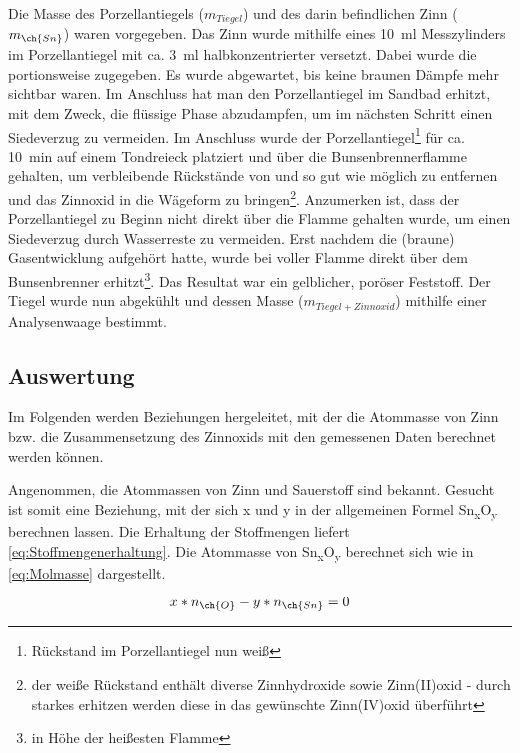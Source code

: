 \documentclass{article}
\begin{document}
      Die Masse des Porzellantiegels ($m_{Tiegel}$) und des darin befindlichen Zinn ($m_{\ch{Sn}}$) waren vorgegeben. Das Zinn wurde mithilfe eines \SI[mode=text]{10}{\milli\litre} Messzylinders im Porzellantiegel mit ca. \SI[mode=text]{3}{\milli\litre} halbkonzentrierter  versetzt. Dabei wurde die  portionsweise zugegeben. Es wurde abgewartet, bis keine braunen Dämpfe mehr sichtbar waren. Im Anschluss hat man den Porzellantiegel im Sandbad erhitzt, mit dem Zweck, die flüssige Phase abzudampfen, um im nächsten Schritt einen Siedeverzug zu vermeiden. Im Anschluss wurde der Porzellantiegel\footnote{Rückstand im Porzellantiegel nun weiß} für ca. \SI[mode=text]{10}{\minute} auf einem Tondreieck platziert und über die Bunsenbrennerflamme gehalten, um verbleibende Rückstände von  und  so gut wie möglich zu entfernen und das Zinnoxid in die Wägeform zu bringen\footnote{der weiße Rückstand enthält diverse Zinnhydroxide sowie Zinn(II)oxid - durch starkes erhitzen werden diese in das gewünschte Zinn(IV)oxid überführt}. Anzumerken ist, dass der Porzellantiegel zu Beginn nicht direkt über die Flamme gehalten wurde, um einen Siedeverzug durch Wasserreste zu vermeiden. Erst nachdem die (braune) Gasentwicklung aufgehört hatte, wurde  bei voller Flamme direkt über dem Bunsenbrenner erhitzt\footnote{in Höhe der heißesten Flamme}. Das Resultat war ein gelblicher, poröser Feststoff. Der Tiegel wurde nun abgekühlt und dessen Masse ($m_{Tiegel+Zinnoxid}$) mithilfe einer Analysenwaage bestimmt.
    
    \pagebreak
     
    \subsection{Auswertung} \label{sec:Auswertung}
      
      Im Folgenden werden Beziehungen hergeleitet, mit der die Atommasse von Zinn bzw. die Zusammensetzung des Zinnoxids mit den gemessenen Daten berechnet werden können. 
      
      Angenommen, die Atommassen von Zinn und Sauerstoff sind bekannt. Gesucht ist somit eine Beziehung, mit der sich x und y in der allgemeinen Formel Sn\textsubscript{x}O\textsubscript{y} berechnen lassen. Die Erhaltung der Stoffmengen liefert \eqref{eq:Stoffmengenerhaltung}. Die Atommasse von Sn\textsubscript{x}O\textsubscript{y} berechnet sich wie in \eqref{eq:Molmasse} dargestellt.
    
      \begin{equation}
        x * n_{\ch{O}} - y * n_{\ch{Sn}} = 0 \label{eq:Stoffmengenerhaltung} 
      \end{equation}
      
\end{document}
